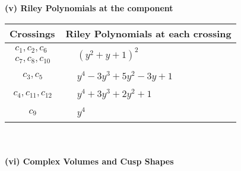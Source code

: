 \documentclass[1p]{elsarticle_modified}
\theoremstyle{definition}
\begin{document}
\newpage\renewcommand{\arraystretch}{1}
\flushleft \textbf{(v) Riley Polynomials at the component}\newline \\
\begin{tabular}{m{50pt}|m{274pt}}
Crossings & \hspace{64pt}Riley Polynomials at each crossing \\
\hline $$\begin{aligned}c_{1},c_{2},c_{6}\\c_{7},c_{8},c_{10}\end{aligned}$$&$\begin{aligned}
&(y^2+y+1)^2
\end{aligned}$\\
\hline $$\begin{aligned}c_{3},c_{5}\end{aligned}$$&$\begin{aligned}
&y^4-3 y^3+5 y^2-3 y+1
\end{aligned}$\\
\hline $$\begin{aligned}c_{4},c_{11},c_{12}\end{aligned}$$&$\begin{aligned}
&y^4+3 y^3+2 y^2+1
\end{aligned}$\\
\hline $$\begin{aligned}c_{9}\end{aligned}$$&$\begin{aligned}
&y^4
\end{aligned}$\\
\hline
\end{tabular}\\~\\
\newpage\flushleft \textbf{(vi) Complex Volumes and Cusp Shapes}
\end{document}
